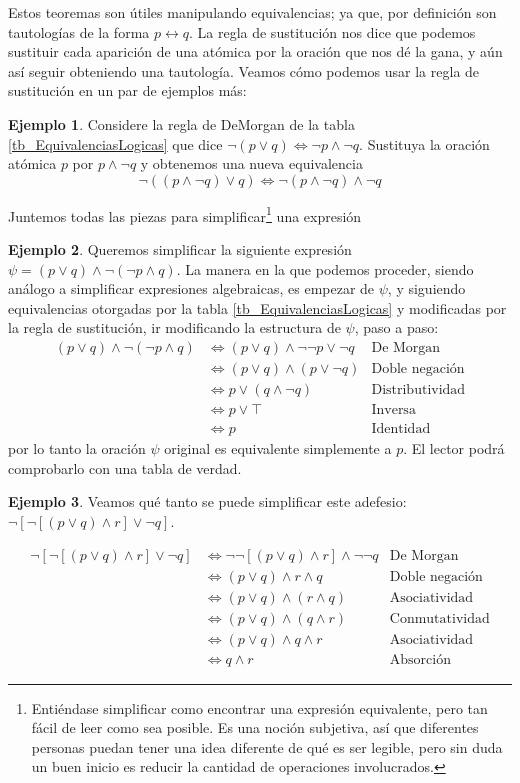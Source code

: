 \documentclass{book}
\theoremstyle{definition}
\newtheorem{ejm}{Ejemplo}[chapter]
\begin{document}
Estos teoremas son útiles manipulando equivalencias; ya que, por definición son tautologías de la forma $p\leftrightarrow q$.
La regla de sustitución nos dice que podemos sustituir cada aparición de una atómica por la oración que nos dé la gana, y aún así seguir obteniendo una tautología.
Veamos cómo podemos usar la regla de sustitución en un par de ejemplos más:
\begin{ejm}
	Considere la regla de DeMorgan de la tabla \ref{tb_EquivalenciasLogicas} que dice $\neg(p \vee q) \iff \neg p \wedge \neg q$. Sustituya la oración atómica $p$ por $p\wedge \neg q$ y obtenemos una nueva equivalencia \[\neg ((p \wedge \neg q) \vee q) \iff \neg (p \wedge \neg q) \wedge \neg q\]
\end{ejm}
Juntemos todas las piezas para simplificar\footnote{Entiéndase simplificar como encontrar una expresión equivalente, pero tan fácil de leer como sea posible. Es una noción subjetiva, así que diferentes personas puedan tener una idea diferente de qué es ser legible, pero sin duda un buen inicio es reducir la cantidad de operaciones involucrados.} una expresión
\begin{ejm}
	Queremos simplificar la siguiente expresión $\psi = (p\vee q)\wedge \neg(\neg p \wedge q)$. La manera en la que podemos proceder, siendo análogo a simplificar expresiones algebraicas, es empezar de $\psi$, y siguiendo equivalencias otorgadas por la tabla \ref{tb_EquivalenciasLogicas} y modificadas por la regla de sustitución, ir modificando la estructura de $\psi$, paso a paso:
	\begin{align*}
		(p\vee q)\wedge \neg(\neg p \wedge q) & \iff (p \vee q)\wedge \neg \neg p \vee \neg q & \text{De Morgan}
		\\ & \iff (p \vee q)\wedge (p\vee \neg q) & \text{Doble negación}
		\\ & \iff p \vee (q \wedge \neg q) & \text{Distributividad}
		\\ & \iff p \vee \top & \text{Inversa}
		\\ & \iff p & \text{Identidad}
	\end{align*}
	por lo tanto la oración $\psi$ original es equivalente simplemente a $p$. El lector podrá comprobarlo con una tabla de verdad.
\end{ejm}
\begin{ejm}
	Veamos qué tanto se puede simplificar este adefesio: $\neg \left[\neg \left[ (p\vee q)\wedge r\right]\vee \neg q \right]$.
	
	\begin{align*}
		\neg \left[\neg \left[ (p\vee q)\wedge r\right]\vee \neg q \right] & \iff \neg \neg \left[ (p\vee q)\wedge r\right] \wedge \neg \neg q & \text{De Morgan} \\
		& \iff  (p\vee q)\wedge r \wedge q & \text{Doble negación}\\
		& \iff (p \vee q)\wedge (r \wedge q) & \text{Asociatividad}\\
		& \iff (p\vee q)\wedge (q \wedge r) & \text{Conmutatividad}\\
		& \iff (p\vee q)\wedge q \wedge r & \text{Asociatividad}\\
		& \iff q \wedge r & \text{Absorción}
	\end{align*}
\end{ejm}
\end{document}
